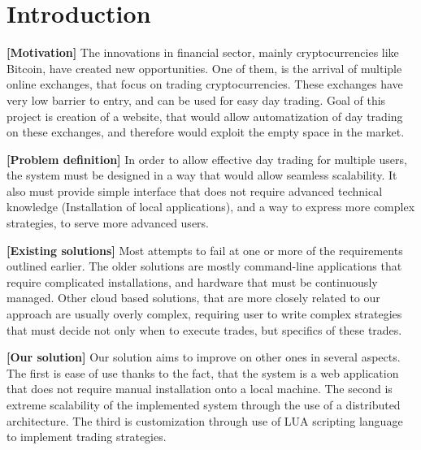 \documentclass{ExcelAtFIT}
\affiliation{*%
\href{mailto:xhorni14@fit.vutbr.cz}{xhorni14@fit.vutbr.cz},
\textit{Faculty of Information Technology, Brno University of Technology}}
\begin{document}
    \startdocument



    \section{Introduction}

    \textbf{[Motivation]}
    The innovations in financial sector, mainly cryptocurrencies like Bitcoin, have created new opportunities. One of them,
    is the arrival of multiple online exchanges, that focus on trading cryptocurrencies. These exchanges have very low
    barrier to entry, and can be used for easy day trading. Goal of this project is creation of a website, that would allow
    automatization of day trading on these exchanges, and therefore would exploit the empty space in the market.

    \textbf{[Problem definition]} In order to allow effective day trading for multiple users, the system must be designed
    in a way that would allow seamless scalability. It also must provide simple interface that does not require advanced technical knowledge
    (Installation of local applications), and a way to express more complex strategies, to serve more advanced users.

    \textbf{[Existing solutions]} Most attempts to fail at one or more of the requirements outlined earlier. The older solutions
    are mostly command-line applications that require complicated installations, and hardware that must be continuously managed.
    Other cloud based solutions, that are more closely related to our approach are usually overly complex, requiring user to write
    complex strategies that must decide not only when to execute trades, but specifics of these trades.

    \textbf{[Our solution]} Our solution aims to improve on other ones in several aspects. The first is ease of use thanks to the fact, that the system
    is a web application that does not require manual installation onto a local machine. The second is extreme scalability
    of the implemented system through the use of a distributed architecture. The third is customization through
    use of LUA scripting language to implement trading strategies.
\end{document}
